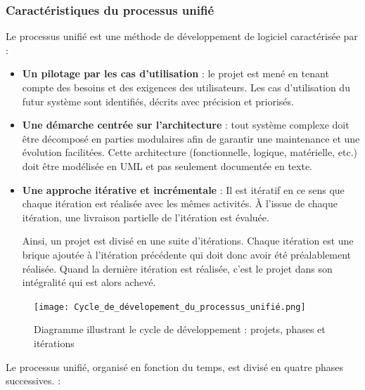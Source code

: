             \subsubsection[Caractéristiques du processus unifié]{Caractéristiques du processus unifié}
            Le processus unifié est une méthode de développement de logiciel caractérisée par :
            \par
            \begin{itemize}
                \setlength{\itemsep}{0pt}
                \item [\ding{226}] \textbf{Un pilotage par les cas d’utilisation} : le projet est mené en
                tenant compte des besoins et des exigences des utilisateurs. Les cas d’utilisation du
                futur système sont identifiés, décrits avec précision et priorisés.
                \item [\ding{226}] \textbf{Une démarche centrée sur l’architecture} : tout système
                complexe doit être décomposé en parties modulaires afin de garantir une maintenance et une
                évolution facilitées. Cette architecture (fonctionnelle, logique, matérielle, etc.)
                doit être modélisée en UML et pas seulement documentée en texte.
                \item [\ding{226}] \textbf{Une approche itérative et incrémentale} : Il est itératif en ce
                sens que chaque itération est réalisée avec les mêmes activités. À l’issue de chaque itération,
                une livraison partielle de l’itération est évaluée.
                \par\noindent
                Ainsi, un projet est divisé en une suite d’itérations. Chaque itération est une brique
                ajoutée à l’itération précédente qui doit donc avoir été préalablement réalisée.
                Quand la dernière itération est réalisée, c’est le projet dans son intégralité qui
                est alors achevé.
            \end{itemize}
            \begin{figure}[H]
                \centering
                \texttt{[image: Cycle\_de\_dévelopement\_du\_processus\_unifié.png]}
                \caption{Diagramme illustrant le cycle de développement :
                projets, phases et itérations}
                \label{fig:CycleDeDev}
            \end{figure}
            Le processus unifié, organisé en fonction du temps, est divisé en quatre phases
            successives. \cite{gabay2008uml} :
